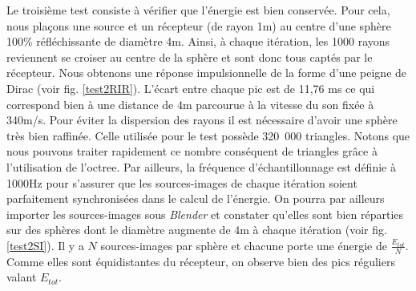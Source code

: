 Le troisième test consiste à vérifier que l'énergie est bien conservée. Pour cela, nous plaçons une source et un récepteur (de rayon 1m) au centre d'une sphère 100\% réfléchissante de diamètre 4m. Ainsi, à chaque itération, les 1000 rayons reviennent se croiser au centre de la sphère et sont donc tous captés par le récepteur. Nous obtenons une réponse impulsionnelle de la forme d'une peigne de Dirac (voir fig. \ref{test2RIR}). L'écart entre chaque pic est de 11,76 ms ce qui correspond bien à une distance de 4m parcourue à la vitesse du son fixée à 340m/s. Pour éviter la dispersion des rayons il est nécessaire d'avoir une sphère très bien raffinée. Celle utilisée pour le test possède 320~000 triangles. Notons que nous pouvons traiter rapidement ce nombre conséquent de triangles grâce à l'utilisation de l'\gls{octree}. Par ailleurs, la fréquence d'échantillonnage est définie à 1000Hz pour s'assurer que les sources-images de chaque itération soient parfaitement synchronisées dans le calcul de l'énergie. On pourra par ailleurs importer les sources-images sous \textit{Blender} et constater qu'elles sont bien réparties sur des sphères dont le diamètre augmente de 4m à chaque itération (voir fig. \ref{test2SI}). Il y a $N$ sources-images par sphère et chacune porte une énergie de $\frac{E_{tot}}{N}$. Comme elles sont équidistantes du récepteur, on observe bien des pics réguliers valant $E_{tot}$.
